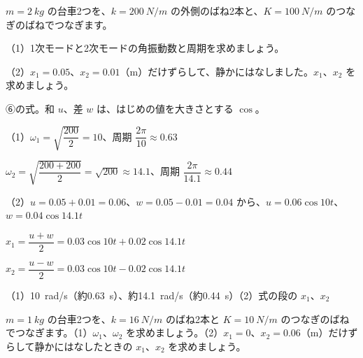 \begin{reidai}[振動モード]
$m=\qty{2}{kg}$ の台車2つを、$k=\qty{200}{N/m}$ の外側のばね2本と、$K=\qty{100}{N/m}$ のつなぎのばねでつなぎます。\par
（1）1次モードと2次モードの角振動数と周期を求めましょう。\par
（2）$x_1=0.05$、$x_2=0.01$（m）だけずらして、静かにはなしました。$x_1$、$x_2$ を求めましょう。\par
\kangaekata ⑥の式。和 $u$、差 $w$ は、はじめの値を大きさとする $\cos$。\par
\shiki\kvios{}\zw{} （1）$\omega_1=\sqrt{\dfrac{200}{2}}=10$、周期 $\dfrac{2\pi}{10}\approx0.63$\par
\kviob $\omega_2=\sqrt{\dfrac{200+200}{2}}=\sqrt{200}\approx14.1$、周期 $\dfrac{2\pi}{14.1}\approx0.44$\par
\kvioq （2）$u=0.05+0.01=0.06$、$w=0.05-0.01=0.04$ から、$u=0.06\cos10t$、$w=0.04\cos14.1t$\par
\kviob $x_1=\dfrac{u+w}{2}=0.03\cos10t+0.02\cos14.1t$\par
\kviob $x_2=\dfrac{u-w}{2}=0.03\cos10t-0.02\cos14.1t$\par
\kotae\kvios{}\zw{} （1）\qty{10}{rad/s}（約\qty{0.63}{s}）、約\qty{14.1}{rad/s}（約\qty{0.44}{s}）\quad （2）式の段の $x_1$、$x_2$
\end{reidai}

\begin{jibun}
$m=\qty{1}{kg}$ の台車2つを、$k=\qty{16}{N/m}$ のばね2本と $K=\qty{10}{N/m}$ のつなぎのばねでつなぎます。\newline（1）$\omega_1$、$\omega_2$ を求めましょう。\newline（2）$x_1=0$、$x_2=0.06$（m）だけずらして静かにはなしたときの $x_1$、$x_2$ を求めましょう。
\end{jibun}



